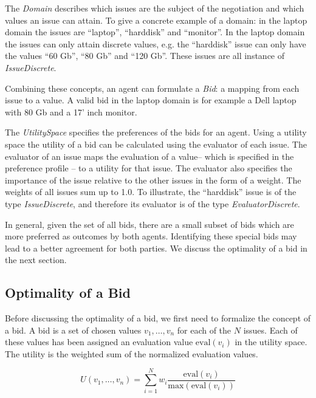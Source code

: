 \documentclass[]{article}
\begin{document}
The \textit{Domain} describes which issues are the subject of the negotiation and which values an issue can attain. To give a concrete example of a domain: in the laptop domain the issues are ``laptop'', ``harddisk'' and ``monitor''. In the laptop domain the issues can only attain discrete values, e.g. the ``harddisk'' issue can only have the values ``60 Gb'', ``80 Gb'' and ``120 Gb''. These issues are all instance of \textit{IssueDiscrete}.

Combining these concepts, an agent can formulate a \textit{Bid}: a mapping from each issue to a value. A valid bid in the laptop domain is for example a Dell laptop with 80 Gb and a 17' inch monitor.

The \textit{UtilitySpace} specifies the preferences of the bids for an agent. Using a utility space the utility of a bid can be calculated using the evaluator of each issue. The evaluator of an issue maps the evaluation of a value-- which is specified in the preference profile -- to a utility for that issue. The evaluator also specifies the importance of the issue relative to the other issues in the form of a weight. The weights of all issues sum up to 1.0. To illustrate, the ``harddisk'' issue is of the type \textit{IssueDiscrete}, and therefore its evaluator is of the type \textit{EvaluatorDiscrete}.

In general, given the set of all bids, there are a small subset of bids which are more preferred as outcomes by both agents. Identifying these special bids may lead to a better agreement for both parties. We discuss the optimality of a bid in the next section.

\subsection{Optimality of a Bid}
Before discussing the optimality of a bid, we first need to formalize the concept of a bid. A bid is a set of chosen values $v_1, \ldots, v_n$  for each of the $N$ issues. Each of these values has been assigned an evaluation value $\text{eval}(v_i)$ in the utility space. The utility is the weighted sum of the normalized evaluation values.

\begin{equation}
	U(v_1, \ldots, v_n) = \sum_{i=1}^{N} w_i \dfrac{\text{eval}(v_i)}{\text{max}(\text{eval}(v_i))}
	\label{eqn:Utility}
\end{equation}
\end{document}

